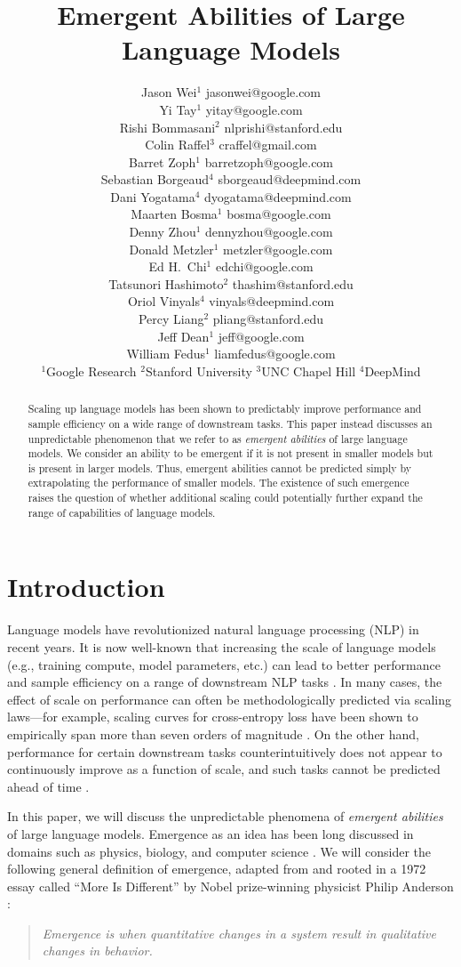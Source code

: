 \documentclass[10pt]{article} %
\title{Emergent Abilities of Large Language Models}
\author{\vspace{1.3mm}\name Jason Wei\hspace{0.5mm}$^{1}$ \email jasonwei@google.com \\ 
        \vspace{1.3mm}\name Yi Tay\hspace{0.5mm}$^{1}$ \email yitay@google.com  \\
        \vspace{1.3mm}\name Rishi Bommasani\hspace{0.5mm}$^{2}$ \email nlprishi@stanford.edu \\
        \vspace{1.3mm}\name Colin Raffel\hspace{0.5mm}$^{3}$ \email craffel@gmail.com \\
        \vspace{1.3mm}\name Barret Zoph\hspace{0.5mm}$^{1}$ \email barretzoph@google.com \\
        \vspace{1.3mm}\name Sebastian Borgeaud\hspace{0.5mm}$^{4}$ \email sborgeaud@deepmind.com \\
        \vspace{1.3mm}\name Dani Yogatama\hspace{0.5mm}$^{4}$ \email dyogatama@deepmind.com \\
        \vspace{1.3mm}\name Maarten Bosma\hspace{0.5mm}$^{1}$ \email bosma@google.com  \\
        \vspace{1.3mm}\name Denny Zhou\hspace{0.5mm}$^{1}$ \email dennyzhou@google.com  \\
        \vspace{1.3mm}\name Donald Metzler\hspace{0.5mm}$^{1}$ \email metzler@google.com  \\
        \vspace{1.3mm}\name Ed H.~Chi\hspace{0.5mm}$^{1}$ \email edchi@google.com  \\
        \vspace{1.3mm}\name Tatsunori Hashimoto\hspace{0.5mm}$^{2}$ \email thashim@stanford.edu \\
        \vspace{1.3mm}\name Oriol Vinyals\hspace{0.5mm}$^{4}$ \email vinyals@deepmind.com \\
        \vspace{1.3mm}\name Percy Liang\hspace{0.5mm}$^{2}$ \email pliang@stanford.edu \\
        \vspace{1.3mm}\name Jeff Dean\hspace{0.5mm}$^{1}$ \email jeff@google.com  \\
        \vspace{3mm}\name William Fedus\hspace{0.5mm}$^{1}$ \email liamfedus@google.com  \\
      \addr $^{1}$Google Research \hspace{1mm} $^{2}$Stanford University \hspace{1mm} $^{3}$UNC Chapel Hill \hspace{1mm} $^{4}$DeepMind \\
      }
\begin{document}
\maketitle

\begin{abstract}
Scaling up language models has been shown to predictably improve performance and sample efficiency on a wide range of downstream tasks.
This paper instead discusses an unpredictable phenomenon that we refer to as \emph{emergent abilities} of large language models.
We consider an ability to be emergent if it is not present in smaller models but is present in larger models.
Thus, emergent abilities cannot be predicted simply by extrapolating the performance of smaller models.
The existence of such emergence raises the question of whether additional scaling could potentially further expand the range of capabilities of language models.
\end{abstract}

\section{Introduction}

Language models have revolutionized natural language processing (NLP) in recent years.
It is now well-known that increasing the scale of language models (e.g., training compute, model parameters, etc.) can lead to better performance and sample efficiency on a range of downstream NLP tasks \citep[][\textit{inter alia}]{devlin-etal-2019-bert,brown2020language}.
In many cases, the effect of scale on performance can often be methodologically predicted via scaling laws---for example, scaling curves for cross-entropy loss have been shown to empirically span more than seven orders of magnitude \citep{kaplan2020scaling,hoffmann2022training}.
On the other hand, performance for certain downstream tasks counterintuitively does not appear to continuously improve as a function of scale, and such tasks cannot be predicted ahead of time \citep{ganguli2022predictability}.


In this paper, we will discuss the unpredictable phenomena of \textit{emergent abilities} of large language models. %
Emergence as an idea has been long discussed in domains such as physics, biology, and computer science \citep[][\textit{inter alia}]{anderson1972more,hwang2012emergent,forrest1990emergent,corradini2010emergence,harper2012new}.
We will consider the following general definition of emergence, adapted from \citet{jacobsdefinition} and rooted in a 1972 essay called ``More Is Different'' by Nobel prize-winning physicist Philip Anderson \citep{anderson1972more}:
\begin{quote}
\textit{Emergence is when quantitative changes in a system result in qualitative changes in behavior.}
\end{quote}
\end{document}
